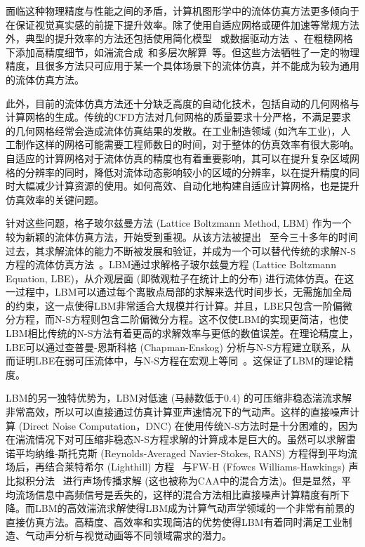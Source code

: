 面临这种物理精度与性能之间的矛盾，计算机图形学中的流体仿真方法更多倾向于在保证视觉真实感的前提下提升效率。除了使用自适应网格或硬件加速等常规方法外，典型的提升效率的方法还包括使用简化模型~\citep{doi.org/10.1111/cgf.12825} 或数据驱动方法~\citep{10.1145/2816795.2818129}、在粗糙网格下添加高精度细节，如湍流合成~\citep{10.1145/1360612.1360649}和多层次解算~\citep{10.1145/1833349.1778785}等。但这些方法牺牲了一定的物理精度，且很多方法只可应用于某一个具体场景下的流体仿真，并不能成为较为通用的流体仿真方法。

此外，目前的流体仿真方法还十分缺乏高度的自动化技术，包括自动的几何网格与计算网格的生成。传统的CFD方法对几何网格的质量要求十分严格，不满足要求的几何网格经常会造成流体仿真结果的发散。在工业制造领域 (如汽车工业)，人工制作这样的网格可能需要工程师数日的时间，对于整体的仿真效率有很大影响。自适应的计算网格对于流体仿真的精度也有着重要影响，其可以在提升复杂区域网格的分辨率的同时，降低对流体动态影响较小的区域的分辨率，以在提升精度的同时大幅减少计算资源的使用。如何高效、自动化地构建自适应计算网格，也是提升仿真效率的关键问题。

针对这些问题，格子玻尔兹曼方法 (Lattice Boltzmann Method, LBM) 作为一个较为新颖的流体仿真方法，开始受到重视。从该方法被提出~\citep{PhysRevLett.61.2332} 至今三十多年的时间过去，其求解流体的能力不断被发展和验证，并成为一个可以替代传统的求解N-S方程的流体仿真方法~\citep{ARUMUGAPERUMAL2015955}。LBM通过求解格子玻尔兹曼方程 (Lattice Boltzmann Equation, LBE)，从介观层面 (即微观粒子在统计上的分布) 进行流体仿真。在这一过程中，LBM可以通过每个离散点局部的求解来迭代时间步长，无需施加全局的约束，这一点使得LBM非常适合大规模并行计算。并且，LBE只包含一阶偏微分方程，而N-S方程则包含二阶偏微分方程。这不仅使LBM的实现更简洁，也使LBM相比传统的N-S方法有着更高的求解效率与更低的数值误差。在理论精度上，LBE可以通过查普曼-恩斯科格 (Chapman-Enskog) 分析与N-S方程建立联系，从而证明LBE在弱可压流体中，与N-S方程在宏观上等同~\citep{Y.H.Qian_1993}。这保证了LBM的理论精度。

LBM的另一独特优势为，LBM对低速 (马赫数低于0.4) 的可压缩非稳态湍流求解非常高效，所以可以直接通过仿真计算亚声速情况下的气动声。这样的直接噪声计算 (Direct Noise Computation，DNC) 在使用传统N-S方法时是十分困难的，因为在湍流情况下对可压缩非稳态N-S方程求解的计算成本是巨大的。虽然可以求解雷诺平均纳维-斯托克斯 (Reynolds-Averaged Navier-Stokes, RANS) 方程得到平均流场后，再结合莱特希尔 (Lighthill) 方程~\citep{doi:10.1098/rspa.1952.0060} 与FW-H (Ffowcs Williams-Hawkings) 声比拟积分法~\citep{doi:10.1098/rsta.1969.0031} 进行声场传播求解 (这也被称为CAA中的混合方法)。但是显然，平均流场信息中高频信号是丢失的，这样的混合方法相比直接噪声计算精度有所下降。而LBM的高效湍流求解使得LBM成为计算气动声学领域的一个非常有前景的直接仿真方法。高精度、高效率和实现简洁的优势使得LBM有着同时满足工业制造、气动声分析与视觉动画等不同领域需求的潜力。

